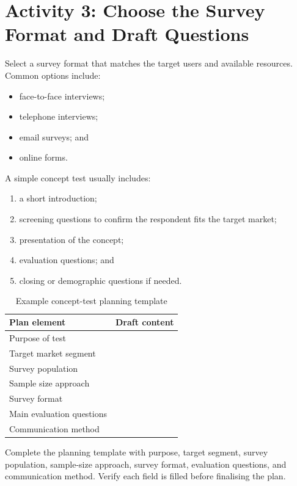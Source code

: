 \section{Activity 3: Choose the Survey Format and Draft Questions}

Select a survey format that matches the target users and available resources. Common options include:
\begin{itemize}
    \item face-to-face interviews;
    \item telephone interviews;
    \item email surveys; and
    \item online forms.
\end{itemize}

A simple concept test usually includes:
\begin{enumerate}
    \item a short introduction;
    \item screening questions to confirm the respondent fits the target market;
    \item presentation of the concept;
    \item evaluation questions; and
    \item closing or demographic questions if needed.
\end{enumerate}

\begin{table}[htbp]
\centering
\caption{Example concept-test planning template}
\label{tab:session12-test-plan}
\renewcommand{\arraystretch}{1.2}
\begin{tabularx}{\textwidth}{|>{\raggedright\arraybackslash}p{}|X|}
\hline
\textbf{Plan element} & \textbf{Draft content} \\
\hline
Purpose of test &  \\
\hline
Target market segment &  \\
\hline
Survey population &  \\
\hline
Sample size approach &  \\
\hline
Survey format &  \\
\hline
Main evaluation questions &  \\
\hline
Communication method &  \\
\hline
\end{tabularx}
\end{table}

\begin{tcolorbox}[title=Checkpoint]
Complete the planning template with purpose, target segment, survey population, sample-size approach, survey format, evaluation questions, and communication method. Verify each field is filled before finalising the plan.
\end{tcolorbox}

